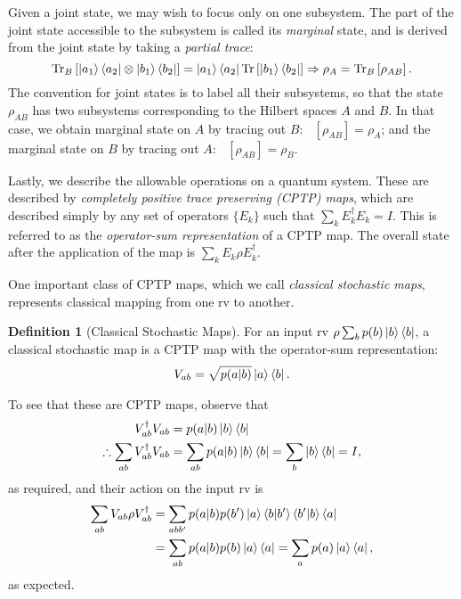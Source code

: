 \documentclass[10pt, a4paper]{article}
\numberwithin{equation}{section} %
\newcounter{stmt} %
\theoremstyle{definition}
\newtheorem{defn}[stmt]{Definition}
\theoremstyle{plain}
\newcommand{\?}{\mathrel{?}} %
\newcommand{\Tr}[2][]{\mathop{\mathrm{Tr}#1}\left[ #2 \right]} %
\begin{document}
\begin{appendices}
                    Given a joint state, we may wish to focus only on one subsystem. The part of the joint state accessible to the subsystem is called its \emph{marginal} state, and is derived from the joint state by taking a \emph{partial trace}:
                    \begin{equation}
                      \Tr[_B]{\ket{a_1}\bra{a_2} \otimes \ket{b_1}\bra{b_2}} = \ket{a_1}\bra{a_2} \Tr{\ket{b_1}\bra{b_2}} \Rightarrow \rho_A = \Tr[_B]{\rho_{AB}}.
                    \end{equation}
                    The convention for joint states is to label all their subsystems, so that the state \(\rho_{AB}\) has two subsystems corresponding to the Hilbert spaces \(A\) and \(B\). In that case, we obtain marginal state on \(A\) by tracing out \(B\): \(\Tr[_B]{\rho_{AB}} = \rho_{A}\); and the marginal state on \(B\) by tracing out \(A\): \(\Tr[_A]{\rho_{AB}} = \rho_{B}\).

                    Lastly, we describe the allowable operations on a quantum system. These are described by \emph{completely positive trace preserving (CPTP) maps}, which are described simply by any set of operators \(\{E_k\}\) such that \(\sum_k E_k^{\dagger}E_k = I\). This is referred to as the \emph{operator-sum representation} of a CPTP map. The overall state after the application of the map is \(\sum_k E_k \rho E_k^{\dagger}\).

                    One important class of CPTP maps, which we call \emph{classical stochastic maps}, represents classical mapping from one rv to another. 
                    \begin{defn}[Classical Stochastic Maps]\label{def:classop}
                      For an input rv \(\rho \sum_b p(b)\ket{b}\bra{b}\), a classical stochastic map is a CPTP map with the operator-sum representation:
                    \begin{align*}
                      V_{ab} = \sqrt{p(a|b)}\ket{a}\bra{b}.
                    \end{align*}
                  \end{defn}
                  To see that these are CPTP maps, observe that
                  \begin{align*}
                    V_{ab}^{\dagger}V_{ab} &= p(a|b)\ket{b}\bra{b} \\
                    \therefore \sum_{ab} V_{ab}^{\dagger}V_{ab} &= \sum_{ab} p(a|b)\ket{b}\bra{b} = \sum_{b} \ket{b}\bra{b} = I,
                  \end{align*}
                  as required, and their action on the input rv is
                  \begin{align*}
                    \sum_{ab} V_{ab}\rho V_{ab}^{\dagger} &= \sum_{abb'} p(a|b)p(b') \ket{a}\braket{b|b'}\braket{b'|b}\bra{a}  \\
                                                          &= \sum_{ab} p(a|b)p(b) \ket{a}\bra{a} = \sum_{a} p(a) \ket{a}\bra{a},
                  \end{align*}
                  as expected.


\end{appendices}
\end{document}

